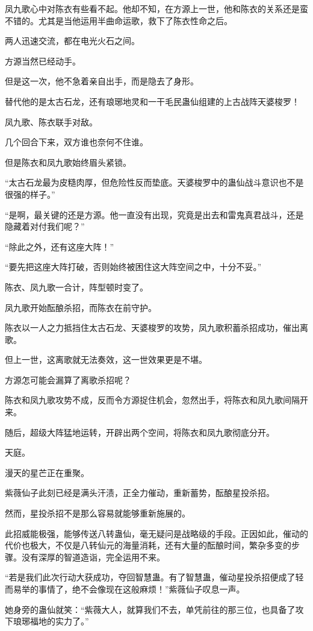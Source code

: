 \begin{this_body}
凤九歌心中对陈衣有些看不起。他却不知，在方源上一世，他和陈衣的关系还是蛮不错的。尤其是当他运用半曲命运歌，救下了陈衣性命之后。

两人迅速交流，都在电光火石之间。

方源当然已经动手。

但是这一次，他不急着亲自出手，而是隐去了身形。

替代他的是太古石龙，还有琅琊地灵和一干毛民蛊仙组建的上古战阵天婆梭罗！

凤九歌、陈衣联手对敌。

几个回合下来，双方谁也奈何不住谁。

但是陈衣和凤九歌始终眉头紧锁。

“太古石龙最为皮糙肉厚，但危险性反而垫底。天婆梭罗中的蛊仙战斗意识也不是很强的样子。”

“是啊，最关键的还是方源。他一直没有出现，究竟是出去和雷鬼真君战斗，还是隐藏着对付我们呢？”

“除此之外，还有这座大阵！”

“要先把这座大阵打破，否则始终被困住这大阵空间之中，十分不妥。”

陈衣、凤九歌一合计，阵型顿时变了。

凤九歌开始酝酿杀招，而陈衣在前守护。

陈衣以一人之力抵挡住太古石龙、天婆梭罗的攻势，凤九歌积蓄杀招成功，催出离歌。

但上一世，这离歌就无法奏效，这一世效果更是不堪。

方源怎可能会漏算了离歌杀招呢？

陈衣和凤九歌攻势不成，反而令方源捉住机会，忽然出手，将陈衣和凤九歌间隔开来。

随后，超级大阵猛地运转，开辟出两个空间，将陈衣和凤九歌彻底分开。

天庭。

漫天的星芒正在重聚。

紫薇仙子此刻已经是满头汗渍，正全力催动，重新蓄势，酝酿星投杀招。

然而，星投杀招不是那么容易就能够重新施展的。

此招威能极强，能够传送八转蛊仙，毫无疑问是战略级的手段。正因如此，催动的代价也极大，不仅是八转仙元的海量消耗，还有大量的酝酿时间，繁杂多变的步骤。没有深厚的智道造诣，完全运用不来。

“若是我们此次行动大获成功，夺回智慧蛊。有了智慧蛊，催动星投杀招便成了轻而易举的事情了，绝不会像现在这般麻烦！”紫薇仙子叹息一声。

她身旁的蛊仙就笑：“紫薇大人，就算我们不去，单凭前往的那三位，也具备了攻下琅琊福地的实力了。”


\end{this_body}
